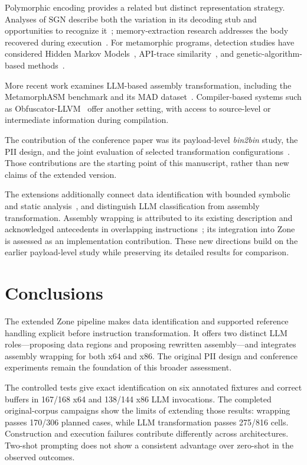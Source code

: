 \documentclass[runningheads]{llncs}
\begin{document}
Polymorphic encoding provides a related but distinct representation strategy. Analyses of SGN describe both the variation in its decoding stub and opportunities to recognize it~\cite{sgn64,sgnstrong}; memory-extraction research addresses the body recovered during execution~\cite{codeExtraction}. For metamorphic programs, detection studies have considered Hidden Markov Models~\cite{wong2006hunting,desai2010highly}, API-trace similarity~\cite{identifyingmeth}, and genetic-algorithm-based methods~\cite{methgenetic}.

More recent work examines LLM-based assembly transformation, including the MetamorphASM benchmark and its MAD dataset~\cite{llmobf,llm2}. Compiler-based systems such as Obfuscator-LLVM~\cite{llvmobf} offer another setting, with access to source-level or intermediate information during compilation.

The contribution of the conference paper was its payload-level \emph{bin2bin} study, the PII design, and the joint evaluation of selected transformation configurations~\cite{zone_secrypt_2026}. Those contributions are the starting point of this manuscript, rather than new claims of the extended version.


The extensions additionally connect data identification with bounded
symbolic and static analysis~\cite{angr_cfg_docs}, and distinguish LLM
classification from assembly transformation. Assembly wrapping is
attributed to its existing description and acknowledged antecedents
in overlapping instructions~\cite{assembly_wrapping}; its integration
into Zone is assessed as an implementation contribution. These new
directions build on the earlier payload-level study while preserving
its detailed results for comparison.

\section{Conclusions}\label{sec:conclusion3}
The extended Zone pipeline makes data identification and supported
reference handling explicit before instruction transformation. It offers
two distinct LLM roles---proposing data regions and proposing rewritten
assembly---and integrates assembly wrapping for both x64 and x86.
The original PII design and conference experiments remain the foundation
of this broader assessment.

The controlled tests give exact identification on six annotated fixtures
and correct buffers in 167/168 x64 and 138/144 x86 LLM invocations.
The completed original-corpus campaigns show the limits of extending
those results: wrapping passes 170/306 planned cases, while LLM
transformation passes 275/816 cells. Construction and execution failures
contribute differently across architectures. Two-shot prompting does not
show a consistent advantage over zero-shot in the observed outcomes.
\end{document}
